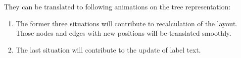 They can be translated to following animations on the tree representation:
\begin {enumerate}
\item The former three situations will contribute to recalculation of the layout. Those nodes and edges with new positions will be translated smoothly.
\item The last situation will contribute to the update of label text.
\end {enumerate}

